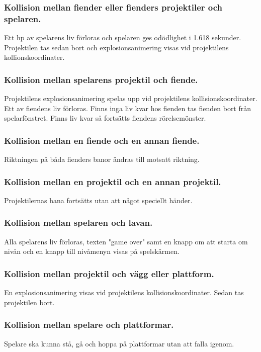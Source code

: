 \documentclass{TDP005mall}
\begin{document}
\subsubsection*{Kollision mellan fiender eller fienders projektiler och spelaren.\label{section:1}}
Ett hp av spelarens liv förloras och spelaren ges odödlighet i 1.618 sekunder. Projektilen tas sedan bort och explosionsanimering visas vid projektilens kollionskoordinater.

\subsubsection*{Kollision mellan spelarens projektil och fiende.\label{section:2}}
Projektilens explosionsanimering spelas upp vid projektilens kollisionskoordinater. Ett av fiendens liv förloras. Finns inga liv kvar hos fienden tas fienden bort från spelarfönstret. Finns liv kvar så fortsätts fiendens rörelsemönster.

\subsubsection*{Kollision mellan en fiende och en annan fiende.\label{section:3}}
Riktningen på båda fienders banor ändras till motsatt riktning.

\subsubsection*{Kollision mellan en projektil och en annan projektil.\label{section:4}}
Projektilernas bana fortsätts utan att något speciellt händer.

\subsubsection*{Kollision mellan spelaren och lavan.\label{section:5}}
Alla spelarens liv förloras, texten "game over" samt en knapp om att starta om nivån och en knapp till nivåmenyn visas på spelskärmen.

\subsubsection*{Kollision mellan projektil och vägg eller plattform.\label{section:6}}
En explosionsanimering visas vid projektilens kollisionskoordinater. Sedan tas projektilen bort.

\subsubsection*{Kollision mellan spelare och plattformar.\label{section:7}}
Spelare ska kunna stå, gå och hoppa på plattformar utan att falla igenom.
\end{document}
